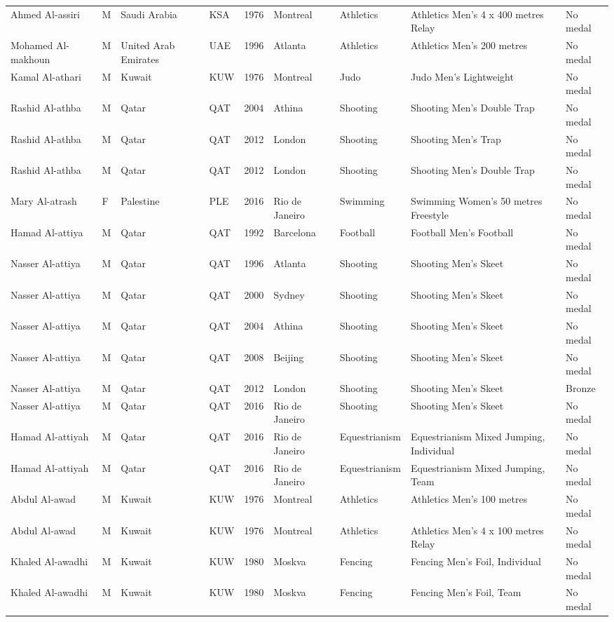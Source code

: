 \documentclass{article}%
\begin{document}
\begin{longtable}{p{1.5cm} p{0.5cm} p{2cm} p{1cm} p{1cm} p{1.5cm} p{1.5cm} p{5cm} p{1.5cm}}
Ahmed Al{-}assiri&M&Saudi Arabia&KSA&1976&Montreal&Athletics&Athletics Men's 4 x 400 metres Relay&No medal\\%
Mohamed Al{-}makhoun&M&United Arab Emirates&UAE&1996&Atlanta&Athletics&Athletics Men's 200 metres&No medal\\%
Kamal Al{-}athari&M&Kuwait&KUW&1976&Montreal&Judo&Judo Men's Lightweight&No medal\\%
Rashid Al{-}athba&M&Qatar&QAT&2004&Athina&Shooting&Shooting Men's Double Trap&No medal\\%
Rashid Al{-}athba&M&Qatar&QAT&2012&London&Shooting&Shooting Men's Trap&No medal\\%
Rashid Al{-}athba&M&Qatar&QAT&2012&London&Shooting&Shooting Men's Double Trap&No medal\\%
Mary Al{-}atrash&F&Palestine&PLE&2016&Rio de Janeiro&Swimming&Swimming Women's 50 metres Freestyle&No medal\\%
Hamad Al{-}attiya&M&Qatar&QAT&1992&Barcelona&Football&Football Men's Football&No medal\\%
Nasser Al{-}attiya&M&Qatar&QAT&1996&Atlanta&Shooting&Shooting Men's Skeet&No medal\\%
Nasser Al{-}attiya&M&Qatar&QAT&2000&Sydney&Shooting&Shooting Men's Skeet&No medal\\%
Nasser Al{-}attiya&M&Qatar&QAT&2004&Athina&Shooting&Shooting Men's Skeet&No medal\\%
Nasser Al{-}attiya&M&Qatar&QAT&2008&Beijing&Shooting&Shooting Men's Skeet&No medal\\%
Nasser Al{-}attiya&M&Qatar&QAT&2012&London&Shooting&Shooting Men's Skeet&Bronze\\%
Nasser Al{-}attiya&M&Qatar&QAT&2016&Rio de Janeiro&Shooting&Shooting Men's Skeet&No medal\\%
Hamad Al{-}attiyah&M&Qatar&QAT&2016&Rio de Janeiro&Equestrianism&Equestrianism Mixed Jumping, Individual&No medal\\%
Hamad Al{-}attiyah&M&Qatar&QAT&2016&Rio de Janeiro&Equestrianism&Equestrianism Mixed Jumping, Team&No medal\\%
Abdul Al{-}awad&M&Kuwait&KUW&1976&Montreal&Athletics&Athletics Men's 100 metres&No medal\\%
Abdul Al{-}awad&M&Kuwait&KUW&1976&Montreal&Athletics&Athletics Men's 4 x 100 metres Relay&No medal\\%
Khaled Al{-}awadhi&M&Kuwait&KUW&1980&Moskva&Fencing&Fencing Men's Foil, Individual&No medal\\%
Khaled Al{-}awadhi&M&Kuwait&KUW&1980&Moskva&Fencing&Fencing Men's Foil, Team&No medal\\%

\end{longtable}
\end{document}
